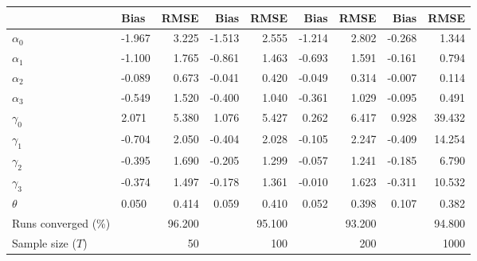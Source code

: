 
\begin{tabular}[t]{llrrrrrrr}
\toprule
  & Bias & RMSE & Bias & RMSE & Bias & RMSE & Bias & RMSE\\
\midrule
$\alpha_{0}$ & -1.967 & 3.225 & -1.513 & 2.555 & -1.214 & 2.802 & -0.268 & 1.344\\
$\alpha_{1}$ & -1.100 & 1.765 & -0.861 & 1.463 & -0.693 & 1.591 & -0.161 & 0.794\\
$\alpha_{2}$ & -0.089 & 0.673 & -0.041 & 0.420 & -0.049 & 0.314 & -0.007 & 0.114\\
$\alpha_{3}$ & -0.549 & 1.520 & -0.400 & 1.040 & -0.361 & 1.029 & -0.095 & 0.491\\
$\gamma_{0}$ & 2.071 & 5.380 & 1.076 & 5.427 & 0.262 & 6.417 & 0.928 & 39.432\\
$\gamma_{1}$ & -0.704 & 2.050 & -0.404 & 2.028 & -0.105 & 2.247 & -0.409 & 14.254\\
$\gamma_{2}$ & -0.395 & 1.690 & -0.205 & 1.299 & -0.057 & 1.241 & -0.185 & 6.790\\
$\gamma_{3}$ & -0.374 & 1.497 & -0.178 & 1.361 & -0.010 & 1.623 & -0.311 & 10.532\\
$\theta$ & 0.050 & 0.414 & 0.059 & 0.410 & 0.052 & 0.398 & 0.107 & 0.382\\
Runs converged (\%) &  & 96.200 &  & 95.100 &  & 93.200 &  & 94.800\\
Sample size ($T$) &  & 50 &  & 100 &  & 200 &  & 1000\\
\bottomrule
\end{tabular}
